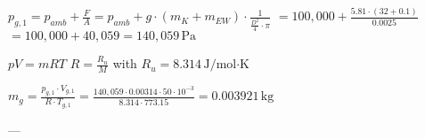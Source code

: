 \( p_{g,1} = p_{amb} + \frac{F}{A} = p_{amb} + g \cdot (m_K + m_{EW}) \cdot \frac{1}{\frac{D^2}{4} \cdot \pi} \)  
\( = 100,000 + \frac{5.81 \cdot (32 + 0.1)}{0.0025} \)  
\( = 100,000 + 40,059 = 140,059 \, \text{Pa} \)  

\( pV = mRT \)  
\( R = \frac{R_u}{M} \) with \( R_u = 8.314 \, \text{J/mol·K} \)  

\( m_g = \frac{p_{g,1} \cdot V_{g,1}}{R \cdot T_{g,1}} = \frac{140,059 \cdot 0.00314 \cdot 50 \cdot 10^{-3}}{8.314 \cdot 773.15} = 0.003921 \, \text{kg} \)  

---